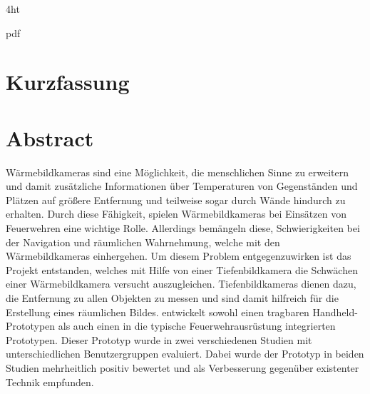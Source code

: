 \documentclass[
               fontsize=12pt, %
               paper=a4,
               oneside, %
               BCOR=3mm, %
               DIV=13,   %
               headinclude=true,
               footinclude=false,
               bibliography=totoc,
               headsepline,
               cleardoublepage=empty,
               parskip=half,
               final   %
               ]{scrbook}
\let\ifdeutsch\iftrue
\begin{document}
\iftex4ht
\Configure{$}{\PicMath}{\EndPicMath}{} 

         {pdf}  
         {%
         }  
\fi

%
%


\VerbatimFootnotes %


\Titelblatt

\pagestyle{preamble}
\renewcommand*{\chapterpagestyle}{preamble}

\ifdeutsch
\section*{Kurzfassung}
\else
\section*{Abstract}
\fi
Wärmebildkameras sind eine Möglichkeit, die menschlichen Sinne zu erweitern und damit zusätzliche Informationen über Temperaturen von Gegenständen und Plätzen auf größere Entfernung und teilweise sogar durch Wände hindurch zu erhalten.
Durch diese Fähigkeit, spielen Wärmebildkameras bei Einsätzen von Feuerwehren eine wichtige Rolle.
Allerdings bemängeln diese, Schwierigkeiten bei der Navigation und räumlichen Wahrnehmung, welche mit den Wärmebildkameras einhergehen.
Um diesem Problem entgegenzuwirken ist das Projekt \profire entstanden, welches mit Hilfe von einer Tiefenbildkamera die Schwächen einer Wärmebildkamera versucht auszugleichen.
Tiefenbildkameras dienen dazu, die Entfernung zu allen Objekten zu messen und sind damit hilfreich für die Erstellung eines räumlichen Bildes.
\profire entwickelt sowohl einen tragbaren Handheld-Prototypen als auch einen in die typische Feuerwehrausrüstung integrierten Prototypen.
Dieser Prototyp wurde in zwei verschiedenen Studien mit unterschiedlichen Benutzergruppen evaluiert.
Dabei wurde der Prototyp in beiden Studien mehrheitlich positiv bewertet und als Verbesserung gegenüber existenter Technik empfunden.
\end{document}
